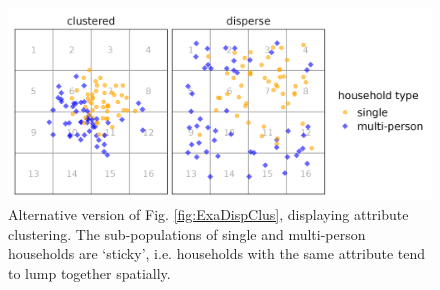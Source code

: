 \begin{figure}[H]
    \centering
    \includegraphics[width=\linewidth]{figures/ExaMap_clus_disp2.png}
    \caption{Alternative version of Fig. \ref{fig:ExaDispClus}, displaying attribute clustering. The sub-populations of single and multi-person households are `sticky', i.e. households with the same attribute tend to lump together spatially.}
    \label{fig:ExaDispClus_sticky}
\end{figure}

